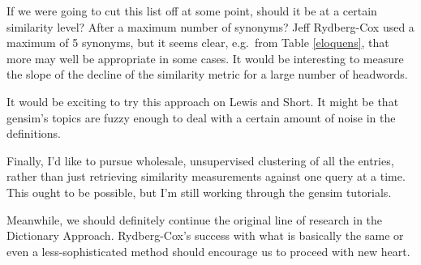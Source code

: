 \documentclass[]{article}
\begin{document}
	If we were going to cut this list off at some point, should it be at a certain similarity level?  After a maximum number of synonyms?  Jeff Rydberg-Cox used a maximum of 5 synonyms, but it seems clear, e.g.\ from Table \ref{eloquens}, that more may well be appropriate in some cases.  It would be interesting to measure the slope of the decline of the similarity metric for a large number of headwords.
	
	It would be exciting to try this approach on Lewis and Short.  It might be that gensim's topics are fuzzy enough to deal with a certain amount of noise in the definitions.
	
	Finally, I'd like to pursue wholesale, unsupervised clustering of all the entries, rather than just retrieving similarity measurements against one query at a time.  This ought to be possible, but I'm still working through the gensim tutorials.
	
	Meanwhile, we should definitely continue the original line of research in the Dictionary Approach.  Rydberg-Cox's success with what is basically the same or even a less-sophisticated method should encourage us to proceed with new heart.
\end{document}
